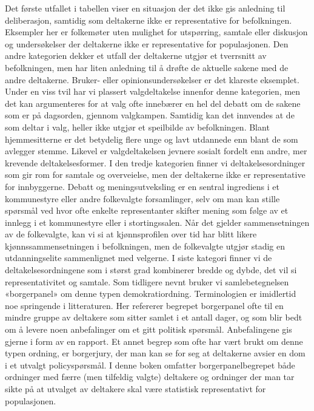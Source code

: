\documentclass[
  12pt,
  a4paper, 12pt]{article}
\begin{document}
Det første utfallet i tabellen viser en situasjon der det ikke gis anledning til deliberasjon, samtidig som deltakerne ikke er representative for befolkningen. Eksempler her er folkemøter uten mulighet for utspørring, samtale eller diskusjon og undersøkelser der deltakerne ikke er representative for populasjonen. Den andre kategorien dekker et utfall der deltakerne utgjør et tverrsnitt av befolkningen, men har liten anledning til å drøfte de aktuelle sakene med de andre deltakerne. Bruker- eller opinionsundersøkelser er det klareste eksemplet. Under en viss tvil har vi plassert valgdeltakelse innenfor denne kategorien, men det kan argumenteres for at valg ofte innebærer en hel del debatt om de sakene som er på dagsorden, gjennom valgkampen. Samtidig kan det innvendes at de som deltar i valg, heller ikke utgjør et speilbilde av befolkningen. Blant hjemmesitterne er det betydelig flere unge og lavt utdannede enn blant de som avlegger stemme. Likevel er valgdeltakelsen jevnere sosialt fordelt enn andre, mer krevende deltakelsesformer. I den tredje kategorien finner vi deltakelsesordninger som gir rom for samtale og overveielse, men der deltakerne ikke er representative for innbyggerne. Debatt og meningsutveksling er en sentral ingrediens i et kommunestyre eller andre folkevalgte forsamlinger, selv om man kan stille spørsmål ved hvor ofte enkelte representanter skifter mening som følge av et innlegg i et kommunestyre eller i stortingssalen. Når det gjelder sammensetningen av de folkevalgte, kan vi si at kjønnsprofilen over tid har blitt likere kjønnssammensetningen i befolkningen, men de folkevalgte utgjør stadig en utdanningselite sammenlignet med velgerne. I siste kategori finner vi de deltakelsesordningene som i størst grad kombinerer bredde og dybde, det vil si representativitet og samtale. Som tidligere nevnt bruker vi samlebetegnelsen «borgerpanel» om denne typen demokratiordning. Terminologien er imidlertid noe springende i litteraturen. Her refererer begrepet borgerpanel ofte til en mindre gruppe av deltakere som sitter samlet i et antall dager, og som blir bedt om å levere noen anbefalinger om et gitt politisk spørsmål. Anbefalingene gis gjerne i form av en rapport. Et annet begrep som ofte har vært brukt om denne typen ordning, er borgerjury, der man kan se for seg at deltakerne avsier en dom i et utvalgt policyspørsmål. I denne boken omfatter borgerpanelbegrepet både ordninger med færre (men tilfeldig valgte) deltakere og ordninger der man tar sikte på at utvalget av deltakere skal være statistisk representativt for populasjonen.
\end{document}
